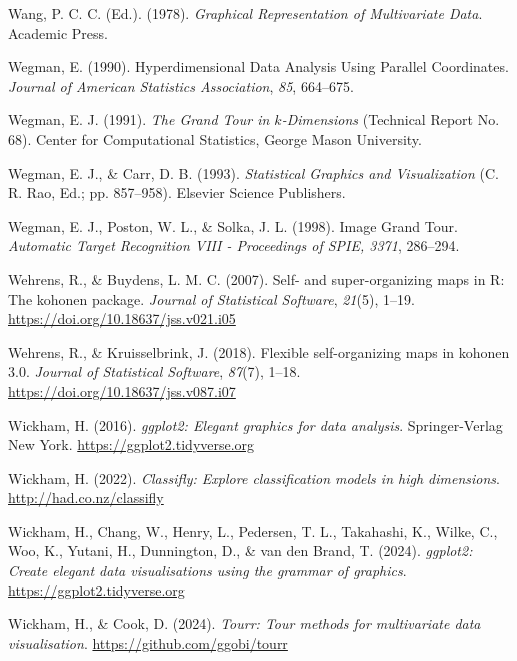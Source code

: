 \documentclass[
  letterpaper,
]{krantz}
\newlength{\cslhangindent}
\newenvironment{CSLReferences}[2] %
 {\begin{list}{}{%
  \setlength{\itemindent}{0pt}
  \setlength{\leftmargin}{0pt}
  \setlength{\parsep}{0pt}
  \ifodd #1
   \setlength{\leftmargin}{\cslhangindent}
   \setlength{\itemindent}{-1\cslhangindent}
  \fi
  \setlength{\itemsep}{#2\baselineskip}}}
 {\end{list}}
\begin{document}
\begin{CSLReferences}{1}{0}
Wang, P. C. C. (Ed.). (1978). \emph{{G}raphical {R}epresentation of
{M}ultivariate {D}ata}. Academic Press.

Wegman, E. (1990). {H}yperdimensional {D}ata {A}nalysis {U}sing
{P}arallel {C}oordinates. \emph{Journal of American Statistics
Association}, \emph{85}, 664--675.

Wegman, E. J. (1991). \emph{The {G}rand {T}our in \(k\)-{D}imensions}
(Technical Report No. 68). Center for Computational Statistics, George
Mason University.

Wegman, E. J., \& Carr, D. B. (1993). \emph{{S}tatistical {G}raphics and
{V}isualization} (C. R. Rao, Ed.; pp. 857--958). Elsevier Science
Publishers.

Wegman, E. J., Poston, W. L., \& Solka, J. L. (1998). Image {G}rand
{T}our. \emph{Automatic Target Recognition VIII - Proceedings of SPIE,
3371}, 286--294.

Wehrens, R., \& Buydens, L. M. C. (2007). Self- and super-organizing
maps in {R}: The {kohonen} package. \emph{Journal of Statistical
Software}, \emph{21}(5), 1--19.
\url{https://doi.org/10.18637/jss.v021.i05}

Wehrens, R., \& Kruisselbrink, J. (2018). Flexible self-organizing maps
in {kohonen} 3.0. \emph{Journal of Statistical Software}, \emph{87}(7),
1--18. \url{https://doi.org/10.18637/jss.v087.i07}

Wickham, H. (2016). \emph{ggplot2: Elegant graphics for data analysis}.
Springer-Verlag New York. \url{https://ggplot2.tidyverse.org}

Wickham, H. (2022). \emph{Classifly: Explore classification models in
high dimensions}. \url{http://had.co.nz/classifly}

Wickham, H., Chang, W., Henry, L., Pedersen, T. L., Takahashi, K.,
Wilke, C., Woo, K., Yutani, H., Dunnington, D., \& van den Brand, T.
(2024). \emph{ggplot2: Create elegant data visualisations using the
grammar of graphics}. \url{https://ggplot2.tidyverse.org}

Wickham, H., \& Cook, D. (2024). \emph{Tourr: Tour methods for
multivariate data visualisation}. \url{https://github.com/ggobi/tourr}


\end{CSLReferences}
\end{document}
